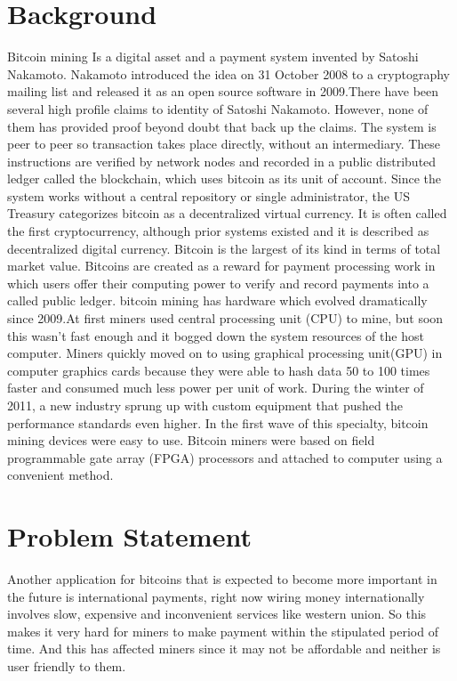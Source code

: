 \documentclass{article}
\begin{document}
\section{Background}
Bitcoin mining Is a digital asset and a payment system invented by Satoshi Nakamoto. Nakamoto introduced the idea on 31 October 2008 to a cryptography mailing list and released it as an open source software in 2009.There have been several high profile claims to identity of Satoshi Nakamoto. However, none of them has provided proof beyond doubt that back up the claims. The system is peer to peer so transaction takes place directly, without an intermediary. These instructions are verified by network nodes and recorded in a public distributed ledger called the blockchain, which uses bitcoin as its unit of account. Since the system works without a central repository or single administrator, the US Treasury categorizes bitcoin as a decentralized virtual currency. It is often called the first cryptocurrency, although prior systems existed and it is described as decentralized digital currency. Bitcoin is the largest of its kind in terms of total market value. Bitcoins are created as a reward for payment processing work in which users offer their computing power to verify and record payments into a called public ledger. bitcoin mining has hardware which evolved dramatically since 2009.At first miners used central processing unit (CPU) to mine, but soon this wasn’t fast enough and it bogged down the system resources of the host computer. Miners quickly moved on to using graphical processing unit(GPU) in computer graphics cards because they were able to hash data 50 to 100 times faster and consumed much less power per unit of work. During the winter of 2011, a new industry sprung up with custom equipment that pushed the performance standards even higher. In the first wave of this specialty, bitcoin mining devices were easy to use. Bitcoin miners were based on field programmable gate array (FPGA) processors and attached to computer using a convenient method.

\section{Problem Statement}
Another application for bitcoins that is expected to become more important in the future is international payments, right now wiring money internationally involves slow, expensive and inconvenient services like western union. So this makes it very hard for miners to make payment within the stipulated period of time. And this has affected miners since it may not be affordable and neither is user friendly to them.
\end{document}
